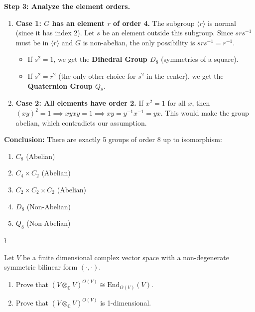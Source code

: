 \begin{solution}
\textbf{Step 3: Analyze the element orders.}
\begin{enumerate}
    \item \textbf{Case 1: $G$ has an element $r$ of order 4.}
    The subgroup $\langle r \rangle$ is normal (since it has index 2). Let $s$ be an element outside this subgroup.
    Since $srs^{-1}$ must be in $\langle r \rangle$ and $G$ is non-abelian, the only possibility is $srs^{-1} = r^{-1}$.
    \begin{itemize}
        \item If $s^2 = 1$, we get the \textbf{Dihedral Group $D_8$} (symmetries of a square).
        \item If $s^2 = r^2$ (the only other choice for $s^2$ in the center), we get the \textbf{Quaternion Group $Q_8$}.
    \end{itemize}
    \item \textbf{Case 2: All elements have order 2.}
    If $x^2 = 1$ for all $x$, then $(xy)^2 = 1 \implies xyxy = 1 \implies xy = y^{-1}x^{-1} = yx$.
    This would make the group abelian, which contradicts our assumption.
\end{enumerate}

\textbf{Conclusion:}
There are exactly 5 groups of order 8 up to isomorphism:
\begin{enumerate}
    \item $C_8$ (Abelian)
    \item $C_4 \times C_2$ (Abelian)
    \item $C_2 \times C_2 \times C_2$ (Abelian)
    \item $D_8$ (Non-Abelian)
    \item $Q_8$ (Non-Abelian)
\end{enumerate}
\end{solution}

\begin{exercise}
\l\label{2014:11}

\label{algebra:2014:11}Let $V$ be a finite dimensional complex vector space with a non-degenerate symmetric bilinear form $(\cdot, \cdot)$.
\begin{enumerate}
    \item Prove that $(V \otimes_\mathbb{C} V)^{O(V)} \cong \text{End}_{O(V)}(V)$.
    \item Prove that $(V \otimes_\mathbb{C} V)^{O(V)}$ is 1-dimensional.
\end{enumerate}
\end{exercise}

